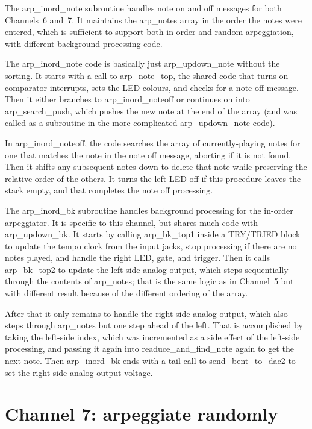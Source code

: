 The arp\_inord\_note subroutine handles note on and off messages for both
Channels~6 and~7.  It maintains the arp\_notes array in the order the notes
were entered, which is sufficient to support both in-order and random
arpeggiation, with different background processing code.

The arp\_inord\_note code is basically just arp\_updown\_note without the
sorting.  It starts with a call to arp\_note\_top, the shared code that
turns on comparator interrupts, sets the LED colours, and checks for a note
off message.  Then it either branches to arp\_inord\_noteoff or continues on
into arp\_search\_push, which pushes the new note at the end of the array
(and was called as a subroutine in the more complicated arp\_updown\_note
code).

In arp\_inord\_noteoff, the code searches the array of currently-playing
notes for one that matches the note in the note off message, aborting if it
is not found.  Then it shifts any subsequent notes down to delete that note
while preserving the relative order of the others.  It turns the left LED
off if this procedure leaves the stack empty, and that completes the note
off processing.

The arp\_inord\_bk subroutine handles background processing for the in-order
arpeggiator.  It is specific to this channel, but shares much code with
arp\_updown\_bk.  It starts by calling arp\_bk\_top1 inside a TRY/TRIED
block to update the tempo clock from the input jacks, stop processing if
there are no notes played, and handle the right LED, gate, and trigger. 
Then it calls arp\_bk\_top2 to update the left-side analog output, which
steps sequentially through the contents of arp\_notes; that is the same
logic as in Channel~5 but with different result because of the different
ordering of the array.

After that it only remains to handle the right-side analog output, which
also steps through arp\_notes but one step ahead of the left.  That is
accomplished by taking the left-side index, which was incremented
as a side effect of the left-side processing, and passing it again into
readuce\_and\_find\_note again to get the next note.  Then arp\_inord\_bk
ends with a tail call to send\_bent\_to\_dac2 to set the right-side analog
output voltage.

\section{Channel 7:  arpeggiate randomly}

